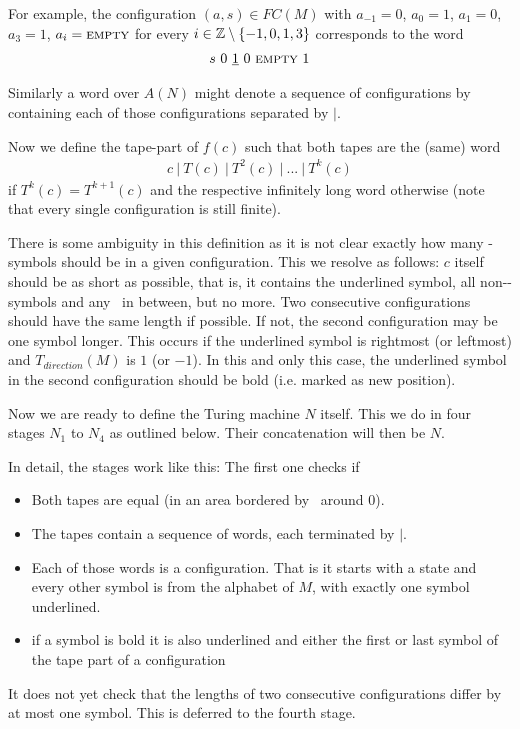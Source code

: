 	For example, the configuration $(a,s) \in FC(M)$ with $a_{-1} = 0$, $a_{0} = 1$, $a_{1} = 0$, $a_{3} = 1$, $a_i = \text{\scshape{empty}}$ for every $i \in \mathbb{Z} \setminus \{-1,0,1,3\}$ corresponds to the word
	\begin{align*}
		s~0~\underline{1}~0~\text{\scshape{empty}}~1
	\end{align*}

	Similarly a word over $A(N)$ might denote a sequence of configurations by containing each of those configurations separated by $|$.

	Now we define the tape-part of $f(c)$ such that both tapes are the (same) word
	\begin{align*}
		c~|~T(c)~|~T^2(c)~|~...~|~T^k(c)
	\end{align*}
	if $T^k(c) = T^{k+1}(c)$ and the respective infinitely long word otherwise (note that every single configuration is still finite).

	There is some ambiguity in this definition as it is not clear exactly how many \EMP-symbols should be in a given configuration.
	This we resolve as follows: $c$ itself should be as short as possible, that is, it contains the underlined symbol, all non-\EMP-symbols and any \EMP~in between, but no more.
	Two consecutive configurations should have the same length if possible. If not, the second configuration may be one symbol longer.
	This occurs if the underlined symbol is rightmost (or leftmost) and $T_{direction}(M)$ is $1$ (or $-1$).
	In this and only this case, the underlined symbol in the second configuration should be bold (i.e. marked as new position).

	Now we are ready to define the Turing machine $N$ itself. This we do in four stages $N_1$ to $N_4$ as outlined below. Their concatenation will then be $N$.
	\begin{figure}[H]
		\centering
		
	\end{figure}
	
	In detail, the stages work like this:
	The first one checks if
	\begin{itemize}
		\item { Both tapes are equal (in an area bordered by \EMP~around $0$). }
		\item { The tapes contain a sequence of words, each terminated by $|$. }
		\item { Each of those words is a configuration. That is it starts with a state and every other symbol is from the alphabet of $M$, with exactly one symbol underlined. }
		\item { if a symbol is bold it is also underlined and either the first or last symbol of the tape part of a configuration }
	\end{itemize}
	It does not yet check that the lengths of two consecutive configurations differ by at most one symbol. This is deferred to the fourth stage.

